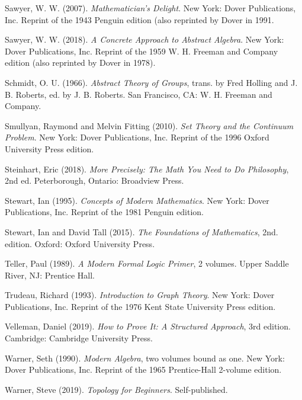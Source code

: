 \documentclass[../../../main.tex]{subfiles}
\begin{document}
\begin{thebibliography}{99}
  Sawyer, W. W. (2007).
  \emph{Mathematician's Delight}.
  New York: Dover Publications, Inc. Reprint of the 1943 Penguin edition (also reprinted by Dover in 1991.

  Sawyer, W. W. (2018).
  \emph{A Concrete Approach to Abstract Algebra}.
  New York: Dover Publications, Inc. Reprint of the 1959 W. H. Freeman and Company edition (also reprinted by Dover in 1978).

  Schmidt, O. U. (1966).
  \emph{Abstract Theory of Groups}, trans. by Fred Holling and J. B. Roberts, ed. by J. B. Roberts.
  San Francisco, CA: W. H. Freeman and Company.

  Smullyan, Raymond and Melvin Fitting (2010).
  \emph{Set Theory and the Continuum Problem}.
  New York: Dover Publications, Inc. Reprint of the 1996 Oxford University Press edition.

  Steinhart, Eric (2018).
  \emph{More Precisely: The Math You Need to Do Philosophy}, 2nd ed.
  Peterborough, Ontario: Broadview Press.

  Stewart, Ian (1995).
  \emph{Concepts of Modern Mathematics}.
  New York: Dover Publications, Inc. Reprint of the 1981 Penguin edition.

  Stewart, Ian and David Tall (2015).
  \emph{The Foundations of Mathematics}, 2nd. edition.
  Oxford: Oxford University Press.

  Teller, Paul (1989).
  \emph{A Modern Formal Logic Primer}, 2 volumes.
  Upper Saddle River, NJ: Prentice Hall.

  Trudeau, Richard (1993).
  \emph{Introduction to Graph Theory}.
  New York: Dover Publications, Inc. Reprint of the 1976 Kent State University Press edition.

  Velleman, Daniel (2019).
  \emph{How to Prove It: A Structured Approach}, 3rd edition.
  Cambridge: Cambridge University Press.

  Warner, Seth (1990).
  \emph{Modern Algebra}, two volumes bound as one.
  New York: Dover Publications, Inc. Reprint of the 1965 Prentice-Hall 2-volume edition.

  Warner, Steve (2019).
  \emph{Topology for Beginners}.
  Self-published.


\end{thebibliography}
\end{document}
